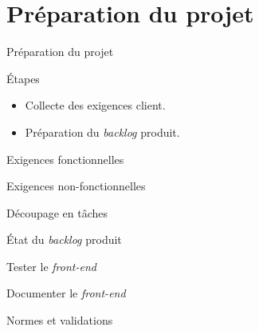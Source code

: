 \section{Préparation du projet}

\begin{frame}{Préparation du projet}
  \begin{block}{Étapes}
    \begin{itemize}
    \item Collecte des exigences client.
    \item Préparation du \textit{backlog} produit.
    \end{itemize}
  \end{block}
\end{frame}

\begin{frame}{Exigences fonctionnelles}  
\end{frame}

\begin{frame}{Exigences non-fonctionnelles}  
\end{frame}

\begin{frame}{Découpage en tâches}  
\end{frame}

\begin{frame}{État du \textit{backlog} produit}  
\end{frame}

\begin{frame}{Tester le \textit{front-end}}
\end{frame}

\begin{frame}{Documenter le \textit{front-end}}
\end{frame}

\begin{frame}{Normes et validations}


\end{frame}
